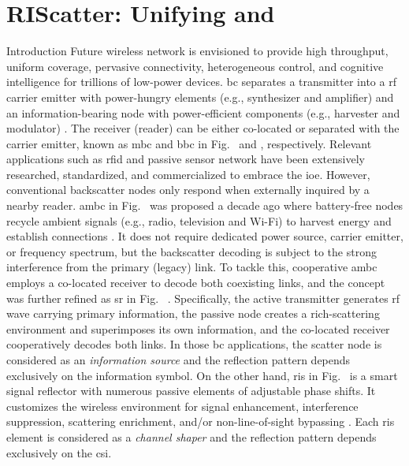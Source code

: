
\graphicspath{{assets/chapter_4/}}

\chapter{RIScatter: Unifying  and }


\begin{section}{Introduction}
	\label{sc:introduction}
	Future wireless network is envisioned to provide high throughput, uniform coverage, pervasive connectivity, heterogeneous control, and cognitive intelligence for trillions of low-power devices.
	\gls{bc} separates a transmitter into a \gls{rf} carrier emitter with power-hungry elements (e.g., synthesizer and amplifier) and an information-bearing node with power-efficient components (e.g., harvester and modulator) \cite{Boyer2014}.
	The receiver (reader) can be either co-located or separated with the carrier emitter, known as \gls{mbc} and \gls{bbc} in Fig.~ and , respectively.
	Relevant applications such as \gls{rfid} \cite{Dobkin2012,Landt2005} and passive sensor network \cite{Vannucci2008,Assimonis2016} have been extensively researched, standardized, and commercialized to embrace the \gls{ioe}.
	However, conventional backscatter nodes only respond when externally inquired by a nearby reader.
	\gls{ambc} in Fig.~ was proposed a decade ago where battery-free nodes recycle ambient signals (e.g., radio, television and Wi-Fi) to harvest energy and establish connections \cite{Liu2013b}.
	It does not require dedicated power source, carrier emitter, or frequency spectrum, but the backscatter decoding is subject to the strong interference from the primary (legacy) link.
	To tackle this, cooperative \gls{ambc} \cite{Yang2018} employs a co-located receiver to decode both coexisting links, and the concept was further refined as \gls{sr} in Fig.~ \cite{Liang2020}.
	Specifically, the active transmitter generates \gls{rf} wave carrying primary information, the passive node creates a rich-scattering environment and superimposes its own information, and the co-located receiver cooperatively decodes both links.
	In those \gls{bc} applications, the scatter node is considered as an \emph{information source} and the reflection pattern depends exclusively on the information symbol.
	On the other hand, \gls{ris} in Fig.~ is a smart signal reflector with numerous passive elements of adjustable phase shifts.
	It customizes the wireless environment for signal enhancement, interference suppression, scattering enrichment, and/or non-line-of-sight bypassing \cite{Wu2021b}.
	Each \gls{ris} element is considered as a \emph{channel shaper} and the reflection pattern depends exclusively on the \gls{csi}.


\end{section}
